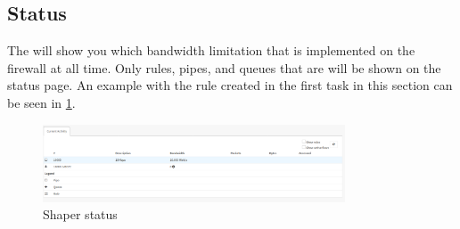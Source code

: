 
\subsection{Status}
The  will show you which bandwidth limitation that is implemented on the firewall at all time. Only rules, pipes, and queues that are  will be shown on the status page. An example with the rule created in the first task in this section can be seen in \ref{opnsense:bandwidth_status}.

\begin{figure}[h!]
    \centering
    \includegraphics[width=0.8\textwidth]{Images/bandwidth/status.PNG}
    \caption{Shaper status}
    \label{opnsense:bandwidth_status}
\end{figure}

